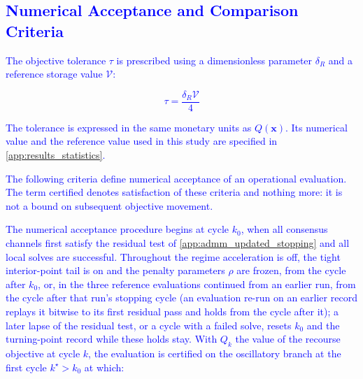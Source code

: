 \documentclass[preprint,12pt]{elsarticle}
\begin{document}
\subsection{\textcolor{blue}{Numerical Acceptance and Comparison Criteria}}
\label{app:admm_updated_certification}

\textcolor{blue}{
    The objective tolerance $\tau$ is prescribed using a dimensionless parameter $\delta_R$ and a reference storage value $\mathcal{V}$:
}

\textcolor{blue}{
    \begin{equation}
        \tau = \frac{\delta_R\mathcal{V}}{4}
        \label{eq:acceptance_tolerance}
    \end{equation}
}

\textcolor{blue}{
    The tolerance is expressed in the same monetary units as $Q(\boldsymbol{x})$. Its numerical value and the reference value used in this study are specified in \ref{app:results_statistics}.
}

\textcolor{blue}{
    The following criteria define numerical acceptance of an operational evaluation. The term certified denotes satisfaction of these criteria and nothing more: it is not a bound on subsequent objective movement.
}

\textcolor{blue}{
    The numerical acceptance procedure begins at cycle $k_0$, when all consensus channels first satisfy the residual test of \ref{app:admm_updated_stopping} and all local solves are successful.
    Throughout the regime acceleration is off, the tight interior-point tail is on and the penalty parameters $\rho$ are frozen, from the cycle after $k_0$, or, in the three reference evaluations continued from an earlier run, from the cycle after that run's stopping cycle (an evaluation re-run on an earlier record replays it bitwise to its first residual pass and holds from the cycle after it);
    a later lapse of the residual test, or a cycle with a failed solve, resets $k_0$ and the turning-point record while these holds stay. With $Q_k$ the value of the recourse objective at cycle $k$, the evaluation is certified on the oscillatory branch at the first cycle $k^{\star} > k_0$ at which:
}
\end{document}
